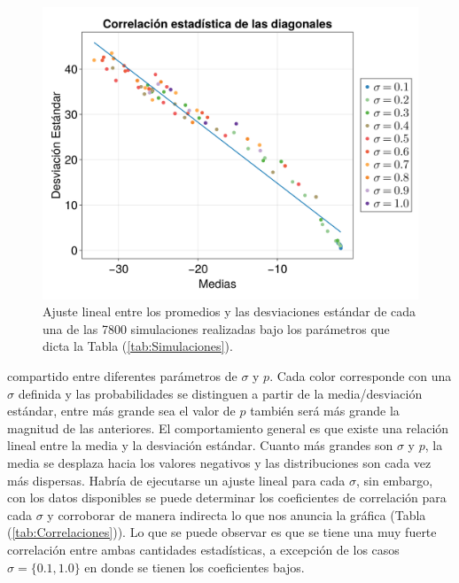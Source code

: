 \documentclass[a4paper,11pt]{book}
\theoremstyle{plain}
\theoremstyle{definition}
\begin{document}
\begin{figure} \vspace{-20pt} \begin{center}
		\includegraphics[scale=0.15]{../Imagenes/CorrelacionMvsStd}
	\end{center}
	\vspace{-20pt} 
	\caption{Ajuste lineal entre los promedios y las desviaciones estándar de cada una de las 7800 simulaciones realizadas bajo los parámetros que dicta la Tabla (\ref{tab:Simulaciones}).}
	\vspace{-10pt}
	\label{fig:CorrelacionMvsStd}
\end{figure}
compartido entre diferentes parámetros de $\sigma$ y $p$. Cada color corresponde con una $\sigma$ definida y las probabilidades se distinguen a partir de la media/desviación estándar, entre más grande sea el valor de $p$ también será más grande la magnitud de las anteriores. El comportamiento general es que existe una relación lineal entre la media y la desviación estándar. Cuanto más grandes son $\sigma$ y $p$, la media se desplaza hacia los valores negativos y las distribuciones son cada vez más dispersas.
Habría de ejecutarse un ajuste lineal para cada $\sigma$, sin embargo, con los datos disponibles se puede determinar los coeficientes de correlación para cada $\sigma$ y corroborar de manera indirecta lo que nos anuncia la gráfica (Tabla (\ref{tab:Correlaciones})). Lo que se puede observar es que se tiene una muy fuerte correlación entre ambas cantidades estadísticas, a excepción de los casos $\sigma=\{0.1,1.0\}$ en donde se tienen los coeficientes bajos. \\
\end{document}
